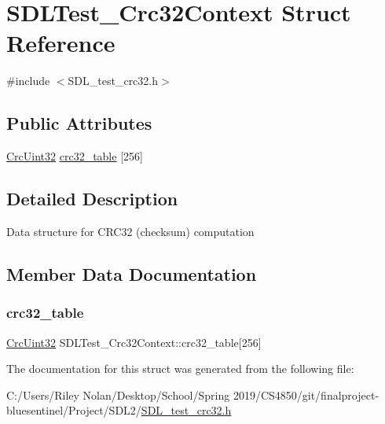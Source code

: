 \hypertarget{struct_s_d_l_test___crc32_context}{}\section{S\+D\+L\+Test\+\_\+\+Crc32\+Context Struct Reference}
\label{struct_s_d_l_test___crc32_context}


{\ttfamily \#include $<$S\+D\+L\+\_\+test\+\_\+crc32.\+h$>$}

\subsection*{Public Attributes}
\begin{DoxyCompactItemize}
\item 
\mbox{\hyperlink{_s_d_l__test__crc32_8h_ac0e8fe38fa91e9aa4b32957420795387}{Crc\+Uint32}} \mbox{\hyperlink{struct_s_d_l_test___crc32_context_ae95d0d0b48bafc4e2f6f032f754ffa4c}{crc32\+\_\+table}} \mbox{[}256\mbox{]}
\end{DoxyCompactItemize}


\subsection{Detailed Description}
Data structure for C\+R\+C32 (checksum) computation 

\subsection{Member Data Documentation}
\mbox{\label{struct_s_d_l_test___crc32_context_ae95d0d0b48bafc4e2f6f032f754ffa4c}} 
\subsubsection{\texorpdfstring{crc32\_table}{crc32\_table}}
{\footnotesize\ttfamily \mbox{\hyperlink{_s_d_l__test__crc32_8h_ac0e8fe38fa91e9aa4b32957420795387}{Crc\+Uint32}} S\+D\+L\+Test\+\_\+\+Crc32\+Context\+::crc32\+\_\+table\mbox{[}256\mbox{]}}



The documentation for this struct was generated from the following file\+:\begin{DoxyCompactItemize}
\item 
C\+:/\+Users/\+Riley Nolan/\+Desktop/\+School/\+Spring 2019/\+C\+S4850/git/finalproject-\/bluesentinel/\+Project/\+S\+D\+L2/\mbox{\hyperlink{_s_d_l__test__crc32_8h}{S\+D\+L\+\_\+test\+\_\+crc32.\+h}}\end{DoxyCompactItemize}
